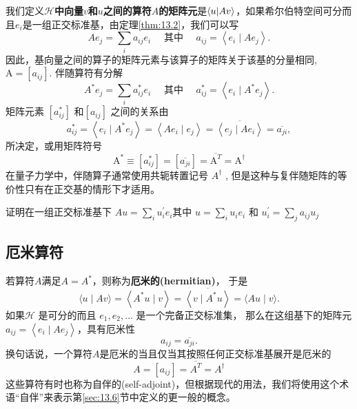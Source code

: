 我们定义\textbf{\(\mathcal{H}\)中向量\(v\)和\(u\)之间的算符\(A\)的矩阵元}是\(\braket{u|Av}\)，如果希尔伯特空间可分而且\(e_i\)是一组正交标准基，由定理\ref{thm:13.2}，我们可以写
$$
A e_{j}=\sum_{i} a_{i j} e_{i} \quad \text { 其中 } \quad a_{i j}=\left\langle e_{i} \mid A e_{j}\right\rangle .
$$
因此，基向量之间的算子的矩阵元素与该算子的矩阵关于该基的分量相同, $\mathrm{A}=\left[a_{i j}\right]$. 伴随算符有分解
$$
A^{*} e_{j}=\sum_{i} a_{i j}^{*} e_{i} \quad \text { 其中 } \quad a_{i j}^{*}=\left\langle e_{i} \mid A^{*} e_{j}\right\rangle .
$$
矩阵元素 $\left[a_{i j}^{*}\right]$ 和$\left[a_{i j}\right]$ 之间的关系由
$$
a_{i j}^{*}=\left\langle e_{i} \mid A^{*} e_{j}\right\rangle=\left\langle A e_{i} \mid e_{j}\right\rangle=\overline{\left\langle e_{j} \mid A e_{i}\right\rangle}=\overline{a_{j i}},
$$
所决定，或用矩阵符号
$$
\mathrm{A}^{*} \equiv\left[a_{i j}^{*}\right]=\left[\overline{a_{j i}}\right]=\overline{\mathrm{A}^{T}}=\mathrm{A}^{\dagger}
$$
在量子力学中，伴随算子通常使用共轭转置记号 $A^{\dagger}$ , 但是这种与复伴随矩阵的等价性只有在正交基的情形下才适用。
\begin{exercise}
 证明在一组正交标准基下 $A u=\sum_{i} u_{i}^{\prime} e_{i} $其中 $u=\sum_{i} u_{i} e_{i} $ 和 $ u_{i}^{\prime}=\sum_{j} a_{i j} u_{j} $
\end{exercise}
\subsection{厄米算符}
若算符$A$满足$A=A^{*}$，则称为\textbf{厄米的(hermitian)}， 于是
$$
\langle u \mid A v\rangle=\left\langle A^{*} u \mid v\right\rangle=\overline{\left\langle v \mid A^{*} u\right\rangle}=\langle A u \mid v\rangle .
$$
如果$\mathcal{H}$ 是可分的而且 $e_{1}, e_{2}, \ldots$ 是一个完备正交标准集， 那么在这组基下的矩阵元$a_{i j}=\left\langle e_{i} \mid A e_{j}\right\rangle$，具有厄米性
$$
a_{i j}=\overline{a_{j i}} .
$$
换句话说，一个算符$A$是厄米的当且仅当其按照任何正交标准基展开是厄米的
$$
A=\left[a_{i j}\right]=\overline{A^{T}}=A^{\dagger}
$$
这些算符有时也称为自伴的(self-adjoint)，但根据现代的用法，我们将使用这个术语“自伴”来表示第\ref{sec:13.6}节中定义的更一般的概念。

